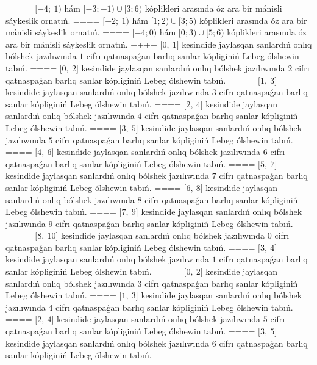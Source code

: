 ====
\(\lbrack - 4;\ 1)\) hám \(\lbrack - 3; - 1) \cup \lbrack 3;6)\) kóplikleri arasında óz ara bir mánisli sáykeslik ornatıń.
====
\(\lbrack - 2;\ 1)\) hám \(\lbrack 1;2) \cup \lbrack 3;5)\) kóplikleri arasında óz ara bir mánisli sáykeslik ornatıń.
====
\(\lbrack - 4;0)\) hám \(\lbrack 0;3) \cup \lbrack 5;6)\) kóplikleri arasında óz ara bir mánisli sáykeslik ornatıń.
++++
\(\lbrack 0,\ 1\rbrack\) kesindide jaylasqan sanlardıń onlıq bólshek jazılıwında \(1\) cifrı qatnaspaǵan barlıq sanlar kópliginiń Lebeg ólshewin tabıń.
====
\(\lbrack 0,\ 2\rbrack\) kesindide jaylasqan sanlardıń onlıq bólshek jazılıwında \(2\) cifrı qatnaspaǵan barlıq sanlar kópliginiń Lebeg ólshewin tabıń.
====
\(\lbrack 1,\ 3\rbrack\) kesindide jaylasqan sanlardıń onlıq bólshek jazılıwında \(3\) cifrı qatnaspaǵan barlıq sanlar kópliginiń Lebeg ólshewin tabıń.
====
\(\lbrack 2,\ 4\rbrack\) kesindide jaylasqan sanlardıń onlıq bólshek jazılıwında \(4\) cifrı qatnaspaǵan barlıq sanlar kópliginiń Lebeg ólshewin tabıń.
====
\(\lbrack 3,\ 5\rbrack\) kesindide jaylasqan sanlardıń onlıq bólshek jazılıwında \(5\) cifrı qatnaspaǵan barlıq sanlar kópliginiń Lebeg ólshewin tabıń.
====
\(\lbrack 4,\ 6\rbrack\) kesindide jaylasqan sanlardıń onlıq bólshek jazılıwında \(6\) cifrı qatnaspaǵan barlıq sanlar kópliginiń Lebeg ólshewin tabıń.
====
\(\lbrack 5,\ 7\rbrack\) kesindide jaylasqan sanlardıń onlıq bólshek jazılıwında \(7\) cifrı qatnaspaǵan barlıq sanlar kópliginiń Lebeg ólshewin tabıń.
====
\(\lbrack 6,\ 8\rbrack\) kesindide jaylasqan sanlardıń onlıq bólshek jazılıwında \(8\) cifrı qatnaspaǵan barlıq sanlar kópliginiń Lebeg ólshewin tabıń.
====
\(\lbrack 7,\ 9\rbrack\) kesindide jaylasqan sanlardıń onlıq bólshek jazılıwında \(9\) cifrı qatnaspaǵan barlıq sanlar kópliginiń Lebeg ólshewin tabıń.
====
\(\lbrack 8,\ 10\rbrack\) kesindide jaylasqan sanlardıń onlıq bólshek jazılıwında \(0\) cifrı qatnaspaǵan barlıq sanlar kópliginiń Lebeg ólshewin tabıń.
====
\(\lbrack 3,\ 4\rbrack\) kesindide jaylasqan sanlardıń onlıq bólshek jazılıwında \(1\) cifrı qatnaspaǵan barlıq sanlar kópliginiń Lebeg ólshewin tabıń.
====
\(\lbrack 0,\ 2\rbrack\) kesindide jaylasqan sanlardıń onlıq bólshek jazılıwında \(3\) cifrı qatnaspaǵan barlıq sanlar kópliginiń Lebeg ólshewin tabıń.
====
\(\lbrack 1,\ 3\rbrack\) kesindide jaylasqan sanlardıń onlıq bólshek jazılıwında \(4\) cifrı qatnaspaǵan barlıq sanlar kópliginiń Lebeg ólshewin tabıń.
====
\(\lbrack 2,\ 4\rbrack\) kesindide jaylasqan sanlardıń onlıq bólshek jazılıwında \(5\) cifrı qatnaspaǵan barlıq sanlar kópliginiń Lebeg ólshewin tabıń.
====
\(\lbrack 3,\ 5\rbrack\) kesindide jaylasqan sanlardıń onlıq bólshek jazılıwında \(6\) cifrı qatnaspaǵan barlıq sanlar kópliginiń Lebeg ólshewin tabıń.

